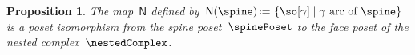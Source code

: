 \documentclass{amsart}
\newtheorem{corollary}[theorem]{Corollary}
\newtheorem{proposition}[theorem]{Proposition}
\newtheorem{lemma}[theorem]{Lemma}
\theoremstyle{definition}
\renewcommand{\b}[1]{{\boldsymbol{#1}}} %
\newcommand{\set}[2]{\left\{ #1 \;\middle|\; #2 \right\}} %
\newcommand{\ssm}{\smallsetminus} %
\newcommand{\eqdef}{\mbox{\,\raisebox{0.2ex}{\scriptsize\ensuremath{\mathrm:}}\ensuremath{=}\,}} %
\newcommand{\viceversa}{\textit{vice versa}} %
\newcommand{\vincent}[1]{\todo[color=blue!30]{#1 \\ \hfill --- V.}}
\newcommand{\negDisjoint}{\perp} %
\newcommand{\posDisjoint}{\;\top\;} %
\newcommand{\compl}[1]{#1{}^\textsc{c}} %
\newcommand{\spineToNested}{\mathsf{N}} %
\begin{document}
%
%
%
%

\begin{proposition}
  \label{prop:spineToNested}
  The map~$\spineToNested$ defined by~$\spineToNested(\spine) \eqdef \set{\so[\gamma]}{\gamma \text{ arc of } \spine}$ is a poset isomorphism from the spine poset~$\spinePoset$ to the face poset of the nested complex~$\nestedComplex$.
\end{proposition}
\end{document}

